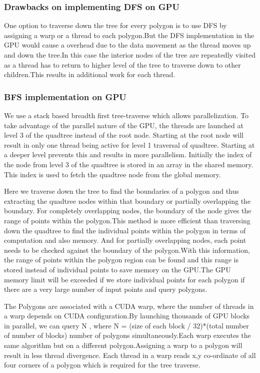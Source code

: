 \documentclass{article}
\begin{document}
\subsubsection{Drawbacks on implementing DFS on GPU}

One option to traverse down the tree for every polygon is to use DFS by assigning a warp or a thread to each polygon.But the DFS implementation in the GPU would cause a overhead due to the data movement as the thread moves up and down the tree.In this case the interior nodes of the tree are repeatedly visited as a thread has to return to higher level of the tree to traverse down to other children.This results in additional work for each thread.

\subsubsection{BFS implementation on GPU}


We use a stack based breadth first tree-traverse which allows parallelization. To take advantage of the parallel nature of the GPU, the threads are launched at level 3 of the quadtree instead of the root node. Starting at the root node will result in only one thread being active for level 1 traversal of quadtree. Starting at a deeper level prevents this and results in more parallelism.
Initially the index of the node from level 3 of the quadtree is stored in an array in the shared memory.
This index is used to fetch the quadtree node from the global memory.

Here we traverse down the tree to find the boundaries of a polygon and thus extracting the quadtree nodes within that boundary or partially overlapping the boundary. For completely overlapping nodes, the boundary of the node gives the range of points within the polygon.This method is more efficient than traversing down the quadtree to find the individual points within the polygon in terms of computation and also memory. And for partially overlapping nodes, each point needs to be checked against the boundary of the polygon.With this information, the range of points within the polygon region can be found and this range is stored instead of individual points to save memory on the GPU.The GPU memory limit will be exceeded if we store individual points for each polygon  if there are a very large number of input points and query polygons.

The Polygons are associated with a CUDA warp, where the number of threads in a warp depends on CUDA configuration.By launching thousands of GPU blocks in parallel, we can query N , where N = (size of each block / 32)*(total number of number of blocks) number of polygons simultaneously.Each warp executes the same algorithm but on a different polygon.Assigning a warp to a polygon will result in less thread divergence. Each thread in a warp reads x,y co-ordinate of all four corners of a polygon which is required for the tree traverse.
\end{document}
